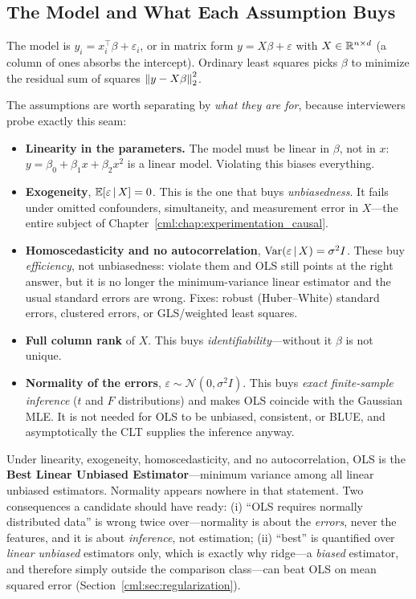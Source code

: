 \subsection{The Model and What Each Assumption Buys}

The model is $y_i = x_i^{\top}\beta + \varepsilon_i$, or in matrix form $y = X\beta + \varepsilon$ with $X \in \mathbb{R}^{n \times d}$ (a column of ones absorbs the intercept). Ordinary least squares picks $\beta$ to minimize the residual sum of squares $\left\lVert y - X\beta\right\rVert_2^2$.

The assumptions are worth separating by \emph{what they are for}, because interviewers probe exactly this seam:

\begin{itemize}
    \item \textbf{Linearity in the parameters.} The model must be linear in $\beta$, not in $x$: $y = \beta_0 + \beta_1 x + \beta_2 x^2$ is a linear model. Violating this biases everything.
    \item \textbf{Exogeneity}, $\operatorname{\mathbb{E}}[\varepsilon \,|\, X] = 0$. This is the one that buys \emph{unbiasedness}. It fails under omitted confounders, simultaneity, and measurement error in $X$---the entire subject of Chapter~\ref{cml:chap:experimentation_causal}.
    \item \textbf{Homoscedasticity and no autocorrelation}, $\operatorname{Var}(\varepsilon \,|\, X) = \sigma^2 I$. These buy \emph{efficiency}, not unbiasedness: violate them and OLS still points at the right answer, but it is no longer the minimum-variance linear estimator and the usual standard errors are wrong. Fixes: robust (Huber--White) standard errors, clustered errors, or GLS/weighted least squares.
    \item \textbf{Full column rank} of $X$. This buys \emph{identifiability}---without it $\beta$ is not unique.
    \item \textbf{Normality of the errors}, $\varepsilon \sim \mathcal{N}(0, \sigma^2 I)$. This buys \emph{exact finite-sample inference} ($t$ and $F$ distributions) and makes OLS coincide with the Gaussian MLE. It is not needed for OLS to be unbiased, consistent, or BLUE, and asymptotically the CLT supplies the inference anyway.
\end{itemize}

\begin{keyinsight}
Under linearity, exogeneity, homoscedasticity, and no autocorrelation, OLS is the \textbf{Best Linear Unbiased Estimator}---minimum variance among all linear unbiased estimators. Normality appears nowhere in that statement. Two consequences a candidate should have ready: (i) ``OLS requires normally distributed data'' is wrong twice over---normality is about the \emph{errors}, never the features, and it is about \emph{inference}, not estimation; (ii) ``best'' is quantified over \emph{linear unbiased} estimators only, which is exactly why ridge---a \emph{biased} estimator, and therefore simply outside the comparison class---can beat OLS on mean squared error (Section~\ref{cml:sec:regularization}).
\end{keyinsight}

